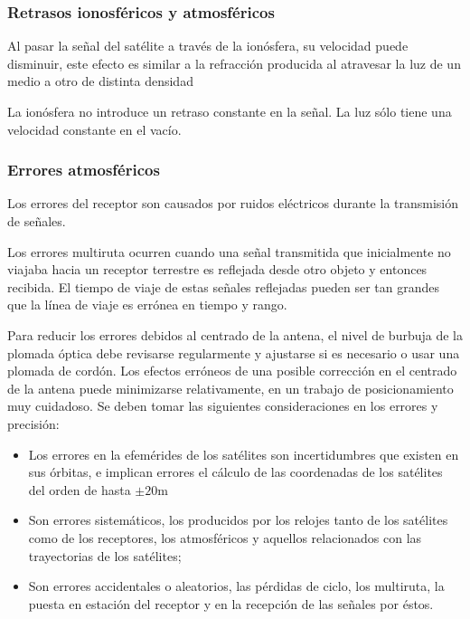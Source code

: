 \subsubsection{Retrasos ionosféricos y atmosféricos}
Al pasar la señal del satélite a través de la ionósfera, su velocidad puede disminuir, este efecto es similar a la refracción producida al atravesar la luz de un medio a otro de distinta densidad

La ionósfera no introduce un retraso constante en la señal.
La luz sólo tiene una velocidad constante en
el vacío.

\subsubsection{Errores atmosféricos}

Los errores del receptor son causados por ruidos eléctricos durante la transmisión de señales.

Los errores multiruta ocurren cuando una señal transmitida que inicialmente no viajaba hacia un receptor terrestre es reflejada desde otro objeto y entonces recibida. El tiempo de viaje de estas señales reflejadas pueden ser tan grandes que la línea de viaje es errónea en tiempo y rango.

Para reducir los errores debidos al centrado de la antena, el nivel de burbuja de la plomada óptica debe revisarse regularmente y ajustarse si es necesario o usar una plomada de cordón. Los efectos erróneos de una posible corrección en el centrado de la antena puede minimizarse relativamente, en un trabajo de posicionamiento muy cuidadoso.
Se deben tomar las siguientes consideraciones en los errores y precisión:
\begin{itemize}
    \item Los errores en la efemérides de los satélites son incertidumbres que existen en sus órbitas, e implican errores el cálculo de las coordenadas de los satélites del orden de hasta $\pm 20$m
    \item Son errores sistemáticos, los producidos por los relojes tanto de los satélites como de los receptores, los atmosféricos y aquellos relacionados con las trayectorias de los satélites;
    \item Son errores accidentales o aleatorios, las pérdidas de ciclo, los multiruta, la puesta en estación del receptor y en la recepción de las señales por éstos.
\end{itemize}

